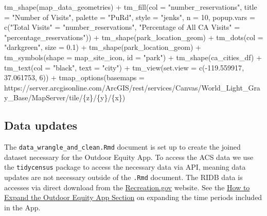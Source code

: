 \documentclass[
  11 pt,
  openany]{book}
\newenvironment{Shaded}{\begin{snugshade}}{\end{snugshade}}
\newcommand{\AttributeTok}[1]{\textcolor[rgb]{0.77,0.63,0.00}{#1}}
\newcommand{\DecValTok}[1]{\textcolor[rgb]{0.00,0.00,0.81}{#1}}
\newcommand{\FloatTok}[1]{\textcolor[rgb]{0.00,0.00,0.81}{#1}}
\newcommand{\FunctionTok}[1]{\textcolor[rgb]{0.00,0.00,0.00}{#1}}
\newcommand{\NormalTok}[1]{#1}
\newcommand{\OtherTok}[1]{\textcolor[rgb]{0.56,0.35,0.01}{#1}}
\newcommand{\SpecialCharTok}[1]{\textcolor[rgb]{0.00,0.00,0.00}{#1}}
\newcommand{\StringTok}[1]{\textcolor[rgb]{0.31,0.60,0.02}{#1}}
\begin{document}
\begin{Shaded}
\begin{Highlighting}[]
\FunctionTok{tm\_shape}\NormalTok{(map\_data\_geometries) }\SpecialCharTok{+}
  \FunctionTok{tm\_fill}\NormalTok{(}\AttributeTok{col =} \StringTok{"number\_reservations"}\NormalTok{,}
          \AttributeTok{title =} \StringTok{"Number of Visits"}\NormalTok{,}
          \AttributeTok{palette =} \StringTok{"PuRd"}\NormalTok{,}
          \AttributeTok{style =} \StringTok{"jenks"}\NormalTok{,}
          \AttributeTok{n =} \DecValTok{10}\NormalTok{,}
          \AttributeTok{popup.vars =} \FunctionTok{c}\NormalTok{(}\StringTok{"Total Visits"} \OtherTok{=} \StringTok{"number\_reservations"}\NormalTok{,}
                         \StringTok{"Percentage of All CA Visits"} \OtherTok{=} \StringTok{"percentage\_reservations"}\NormalTok{)) }\SpecialCharTok{+}
  \FunctionTok{tm\_shape}\NormalTok{(park\_location\_geom) }\SpecialCharTok{+}
  \FunctionTok{tm\_dots}\NormalTok{(}\AttributeTok{col =} \StringTok{"darkgreen"}\NormalTok{, }\AttributeTok{size =} \FloatTok{0.1}\NormalTok{) }\SpecialCharTok{+}
  \FunctionTok{tm\_shape}\NormalTok{(park\_location\_geom) }\SpecialCharTok{+}
  \FunctionTok{tm\_symbols}\NormalTok{(}\AttributeTok{shape =}\NormalTok{ map\_site\_icon,}
             \AttributeTok{id =} \StringTok{"park"}\NormalTok{) }\SpecialCharTok{+}
  \FunctionTok{tm\_shape}\NormalTok{(ca\_cities\_df) }\SpecialCharTok{+}
  \FunctionTok{tm\_text}\NormalTok{(}\AttributeTok{col =} \StringTok{"black"}\NormalTok{,}
          \AttributeTok{text =} \StringTok{"city"}\NormalTok{) }\SpecialCharTok{+}
  \FunctionTok{tm\_view}\NormalTok{(}\AttributeTok{set.view =} \FunctionTok{c}\NormalTok{(}\SpecialCharTok{{-}}\FloatTok{119.559917}\NormalTok{, }\FloatTok{37.061753}\NormalTok{, }\DecValTok{6}\NormalTok{)) }\SpecialCharTok{+}
  \FunctionTok{tmap\_options}\NormalTok{(}\AttributeTok{basemaps =} \StringTok{\textquotesingle{}https://server.arcgisonline.com/ArcGIS/rest/services/Canvas/World\_Light\_Gray\_Base/MapServer/tile/\{z\}/\{y\}/\{x\}\textquotesingle{}}\NormalTok{)}
\end{Highlighting}
\end{Shaded}

\hypertarget{data-updates}{%
\subsection{Data updates}\label{data-updates}}

The \texttt{data\_wrangle\_and\_clean.Rmd} document is set up to create the joined dataset necessary for the Outdoor Equity App. To access the ACS data we use the \texttt{tidycensus} package \citep{R-tidycensus} to access the necessary data via API, meaning data updates are not necessary outside of the \texttt{.Rmd} document. The RIDB data is accesses via direct download from the \href{https://ridb.recreation.gov/download}{Recreation.gov} website. See the \protect\hyperlink{how-to-expand-the-outdoor-equity-app}{How to Expand the Outdoor Equity App Section} on expanding the time periods included in the App.
\end{document}
